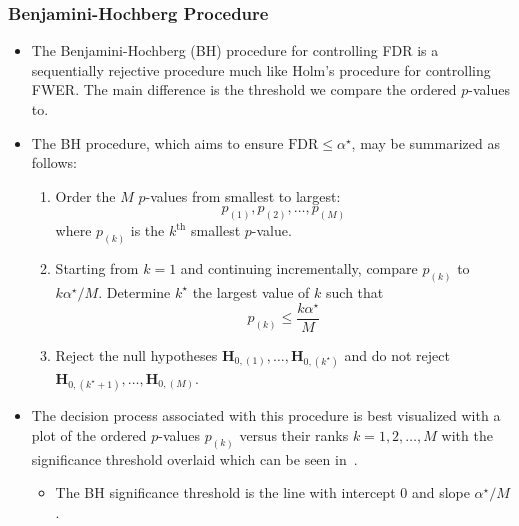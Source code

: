 \subsubsection*{Benjamini-Hochberg Procedure}
\begin{itemize}
      \item The Benjamini-Hochberg (BH) procedure for controlling FDR is a sequentially rejective procedure
            much like Holm's procedure for controlling FWER\@. The main difference is the threshold we
            compare the ordered $ p $-values to.
      \item The BH procedure, which aims to ensure $ \text{FDR}\le \alpha^\star $, may be summarized as follows:
            \begin{framed}
                  \begin{enumerate}
                        \item Order the $M$ $p$-values from smallest to largest:
                              \[ p_{(1)},p_{(2)},\ldots,p_{(M)} \]
                              where $ p_{(k)} $ is the $ k^{\text{th}} $ smallest $ p $-value.
                        \item Starting from $ k=1 $ and continuing incrementally, compare
                              $ p_{(k)} $ to $ k\alpha^\star/M $. Determine $ k^\star $
                              the largest value of $ k $ such that
                              \[ p_{(k)}\le \frac{k\alpha^\star}{M}  \]
                        \item Reject the null hypotheses $ \mathbf{H}_{0,(1)},\ldots,\mathbf{H}_{0,(k^\star)} $
                              and do not reject $ \mathbf{H}_{0,(k^\star+1)},\ldots,\mathbf{H}_{0,(M)} $.
                  \end{enumerate}
            \end{framed}
      \item The decision process associated with this procedure is best visualized with a plot of the ordered $p$-values
            $ p_{(k)} $ versus their ranks $ k=1,2,\ldots,M $ with the significance threshold overlaid which can
            be seen in~.
            \begin{itemize}
                  \item The BH significance threshold is the line with intercept $0$ and slope $ \alpha^\star/M $.
            \end{itemize}
            \begin{figure}[!htbp]
                  \centering

\end{figure}
\end{itemize}
